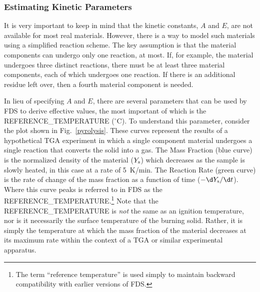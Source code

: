 \documentclass[11pt]{book}
\begin{document}
\subsubsection{Estimating Kinetic Parameters}

It is very important to keep in mind that the kinetic constants, $A$ and $E$, are not available for most real materials.  However, there is a way to model such materials using a simplified reaction scheme. The key assumption is that the material components can undergo only one reaction, at most. If, for example, the material undergoes three distinct reactions, there must be at least three material components, each of which undergoes one reaction. If there is an additional residue left over, then a fourth material component is needed.

In lieu of specifying $A$ and $E$, there are several parameters that can be used by FDS to derive effective values, the most important of which is the  {\ct REFERENCE\_TEMPERATURE} ($^\circ$C). To understand this parameter, consider the plot shown in Fig.~\ref{pyrolysis}. These curves represent the results of a hypothetical TGA experiment in which a single component material undergoes a single reaction that converts the solid into a gas. The Mass Fraction (blue curve) is the normalized density of the material ($Y_{\rm s}$) which decreases as the sample is slowly heated, in this case at a rate of 5~K/min. The Reaction Rate (green curve) is the rate of change of the mass fraction as a function of time ($-\d Y_{\rm s}/\d t$). Where this curve peaks is referred to in FDS as the {\ct REFERENCE\_TEMPERATURE}.\footnote{The term ``reference temperature'' is used simply to maintain backward compatibility with earlier versions of FDS.}  Note that the {\ct REFERENCE\_TEMPERATURE} is {\em not} the same as an ignition temperature, nor is it necessarily the surface temperature of the burning solid. Rather, it is simply the temperature at which the mass fraction of the material decreases at its maximum rate within the context of a TGA or similar experimental apparatus.
\end{document}
